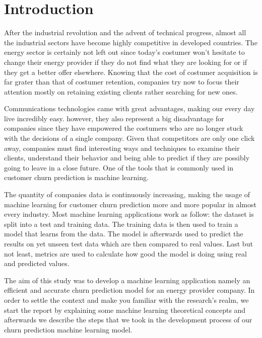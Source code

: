 \documentclass[LaM,binding=0.6cm, english]{sapthesis}
\begin{document}
\printnoidxglossaries

\listoffigures

\listoftables

\mainmatter

\chapter{Introduction}

\par After the industrial revolution and the advent of technical progress, almost all the industrial sectors have become highly competitive in developed countries. The energy sector is certainly not left out since today's costumer won't hesitate to change their energy provider if they do not find what they are looking for or if they get a better offer elsewhere. Knowing that the cost of costumer acquisition is far grater than that of costumer retention, companies try now to focus their attention mostly on retaining existing clients rather searching for new ones.

\par Communications technologies came with great advantages, making our every day live incredibly easy. however, they also represent a big disadvantage for companies since they have empowered the costumers who are no longer stuck with the decisions of a single company. Given that competitors are only one click away, companies must find interesting ways and techniques to examine their clients, understand their behavior and being able to predict if they are possibly going to leave in a close future. One of the tools that is commonly used in customer churn prediction is machine learning.

\par The quantity of companies data is continuously increasing, making the usage of machine learning for customer churn prediction more and more popular in almost every industry. Most machine learning applications work as follow: the dataset is split into a test and training data. The training data is then used to train a model that learns from the data. The model is afterwards used to predict the results on yet unseen test data which are then compared to real values. Last but not least, metrics are used to calculate how good the model is doing using real and predicted values.\cite{Geron2017}

\par The aim of this study was to develop a machine learning application namely an efficient and accurate churn prediction model for an energy provider company. In order to settle the context and make you familiar with the research's realm, we start the report by explaining some machine learning theoretical concepts and afterwards we describe the steps that we took in the development process of our churn prediction machine learning model.
\end{document}
